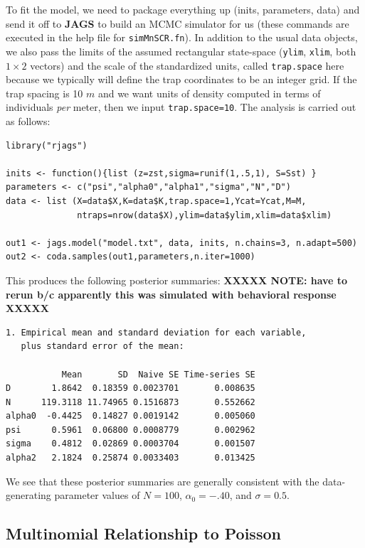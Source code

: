 To fit the model, we need to package everything up (inits, parameters, data) and send
it off to \mbox{\bf JAGS} to build an MCMC simulator for us (these commands are
executed in the help file for \mbox{\tt simMnSCR.fn}). In addition to
the usual data objects, we also pass the limits of the assumed
rectangular state-space (\mbox{\tt ylim}, \mbox{\tt xlim}, both $1
\times 2$ vectors) and the scale of the standardized units, called
\mbox{\tt trap.space} here because we typically will define the trap
coordinates to be an integer grid. If the trap spacing is 10 $m$ and
we want units of density computed in terms of individuals {\it per}
meter, then we input \mbox{\tt trap.space=10}. The analysis is carried
out as follows:
{\small
\begin{verbatim}
library("rjags")

inits <- function(){list (z=zst,sigma=runif(1,.5,1), S=Sst) }
parameters <- c("psi","alpha0","alpha1","sigma","N","D")
data <- list (X=data$X,K=data$K,trap.space=1,Ycat=Ycat,M=M,
              ntraps=nrow(data$X),ylim=data$ylim,xlim=data$xlim)

out1 <- jags.model("model.txt", data, inits, n.chains=3, n.adapt=500)
out2 <- coda.samples(out1,parameters,n.iter=1000)
\end{verbatim}
}
This produces the following posterior summaries: {\bf XXXXX NOTE: have
  to rerun b/c apparently this was simulated with behavioral response XXXXX}
{\small
\begin{verbatim}
1. Empirical mean and standard deviation for each variable,
   plus standard error of the mean:

           Mean       SD  Naive SE Time-series SE
D        1.8642  0.18359 0.0023701       0.008635
N      119.3118 11.74965 0.1516873       0.552662
alpha0  -0.4425  0.14827 0.0019142       0.005060
psi      0.5961  0.06800 0.0008779       0.002962
sigma    0.4812  0.02869 0.0003704       0.001507
alpha2   2.1824  0.25874 0.0033403       0.013425

\end{verbatim}
}
We see that these posterior summaries are generally
consistent with the data-generating parameter values of
$N=100$, $\alpha_{0}= -.40$, and $\sigma=0.5$.


\subsection{Multinomial Relationship to Poisson}

